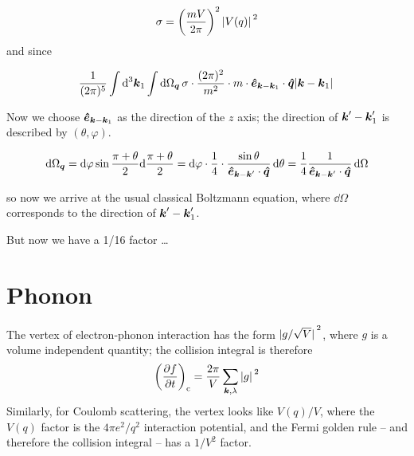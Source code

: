 \documentclass[hyperref, a4paper]{article}
\begin{document}
\begin{equation}
    \sigma = \left(\frac{m V}{2\pi}\right)^2 \abs*{V(q)}^2 
\end{equation}
and since 

\begin{equation}
    \frac{1}{(2\pi)^5} \int \dd[3]{\vb*{k}_1} \int \dd{\Omega_{\vb*{q}}} \sigma 
    \cdot \frac{(2\pi)^2}{m^2} \cdot m \cdot \vu*{e}_{\vb*{k} - \vb*{k}_1} \cdot \vu*{q} \abs*{\vb*{k} - \vb*{k}_1}
\end{equation}

Now we choose $\vu*{e}_{\vb*{k} - \vb*{k}_1}$ as the direction of the $z$ axis; 
the direction of $\vb*{k}' - \vb*{k}_1'$ is described by $(\theta, \varphi)$.

\begin{equation}
    \dd{\Omega_{\vb*{q}}} = \dd{\varphi} \sin \frac{\pi + \theta}{2} \dd \frac{\pi + \theta}{2} 
    = \dd{\varphi} \cdot \frac{1}{4} \cdot \frac{\sin \theta}{\vu*{e}_{\vb*{k} - \vb*{k}'} \cdot \vu*{q}} \dd{\theta}
    = \frac{1}{4} \frac{1}{\vu*{e}_{\vb*{k} - \vb*{k}'} \cdot \vu*{q}} \dd{\Omega}
\end{equation}

so now we arrive at the usual classical Boltzmann equation, 
where $\dd{\Omega}$ corresponds to the direction of $\vb*{k}' - \vb*{k}'_1$.

But now we have a 1/16 factor \dots

\section{Phonon}

The vertex of electron-phonon interaction has the form $\abs*{g / \sqrt{V}}^2$,
where $g$ is a volume independent quantity;
the collision integral is therefore 
\begin{equation}
    \left(\pdv{f}{t}\right)_{\text{c}} = 
    \frac{2\pi}{V} \sum_{\vb*{k}, \lambda} \abs*{g}^2 
\end{equation}
Similarly, for Coulomb scattering, 
the vertex looks like $V(q) / V$, where the $V(q)$ factor 
is the $4 \pi e^2 / q^2$ interaction potential, 
and the Fermi golden rule -- and therefore the collision integral -- 
has a $1/ V^2$ factor.
\end{document}

